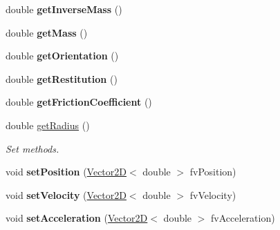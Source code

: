 \begin{DoxyCompactItemize}
\item 
\hypertarget{class_collidable_a3ceb05fc466651c75f1c23231a9cf7a9}{}double {\bfseries get\+Inverse\+Mass} ()\label{class_collidable_a3ceb05fc466651c75f1c23231a9cf7a9}

\item 
\hypertarget{class_collidable_a345fc798e6a77b293c1db72861f0e0e7}{}double {\bfseries get\+Mass} ()\label{class_collidable_a345fc798e6a77b293c1db72861f0e0e7}

\item 
\hypertarget{class_collidable_a0f8359be0151a1459adb832a8bc579fe}{}double {\bfseries get\+Orientation} ()\label{class_collidable_a0f8359be0151a1459adb832a8bc579fe}

\item 
\hypertarget{class_collidable_acf2920747b5a970b7f8280b1d04cdc94}{}double {\bfseries get\+Restitution} ()\label{class_collidable_acf2920747b5a970b7f8280b1d04cdc94}

\item 
\hypertarget{class_collidable_abba60551401e8054396b6c2408af7a8d}{}double {\bfseries get\+Friction\+Coefficient} ()\label{class_collidable_abba60551401e8054396b6c2408af7a8d}

\item 
\hypertarget{class_collidable_a265fb4ef01dc1997494374205181a6bb}{}double \hyperlink{class_collidable_a265fb4ef01dc1997494374205181a6bb}{get\+Radius} ()\label{class_collidable_a265fb4ef01dc1997494374205181a6bb}

\begin{DoxyCompactList}\small\item\em Set methods. \end{DoxyCompactList}\item 
\hypertarget{class_collidable_ae32eb0a55753347190758d00e403c7e8}{}void {\bfseries set\+Position} (\hyperlink{class_vector2_d}{Vector2\+D}$<$ double $>$ fv\+Position)\label{class_collidable_ae32eb0a55753347190758d00e403c7e8}

\item 
\hypertarget{class_collidable_af6355717261e9475643232f31ec46424}{}void {\bfseries set\+Velocity} (\hyperlink{class_vector2_d}{Vector2\+D}$<$ double $>$ fv\+Velocity)\label{class_collidable_af6355717261e9475643232f31ec46424}

\item 
\hypertarget{class_collidable_a669e3a62211f10242fdd9d18ed160356}{}void {\bfseries set\+Acceleration} (\hyperlink{class_vector2_d}{Vector2\+D}$<$ double $>$ fv\+Acceleration)\label{class_collidable_a669e3a62211f10242fdd9d18ed160356}


\end{DoxyCompactItemize}
